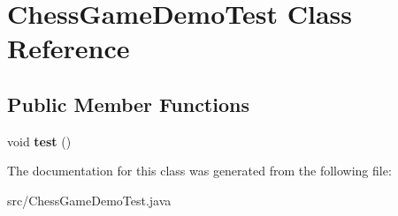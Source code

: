 \hypertarget{class_chess_game_demo_test}{\section{Chess\-Game\-Demo\-Test Class Reference}
\label{class_chess_game_demo_test}
}
\subsection*{Public Member Functions}
\begin{DoxyCompactItemize}
\item 
\hypertarget{class_chess_game_demo_test_ac92ec040d29bab38c5fd83ebaf19d9f9}{void {\bfseries test} ()}\label{class_chess_game_demo_test_ac92ec040d29bab38c5fd83ebaf19d9f9}

\end{DoxyCompactItemize}


The documentation for this class was generated from the following file\-:\begin{DoxyCompactItemize}
\item 
src/Chess\-Game\-Demo\-Test.\-java\end{DoxyCompactItemize}
